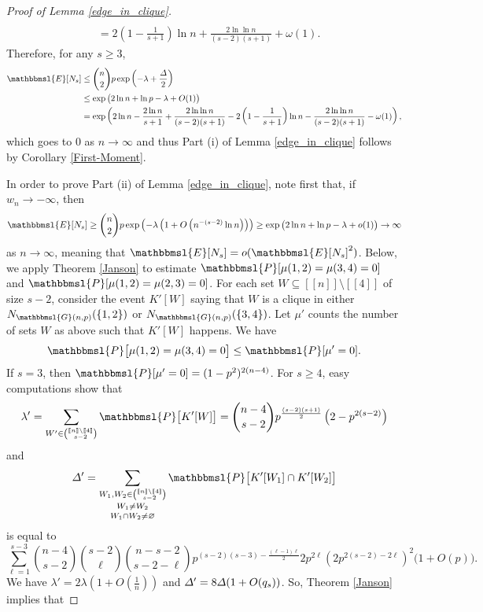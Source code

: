 \documentclass[hidelinks, 11pt]{article}
\theoremstyle{plain}
\theoremstyle{definition}
\begin{document}
\begin{proof}[Proof of Lemma \ref{edge_in_clique}]
\begin{align*}
\\&=2\left(1-\frac{1}{s+1}\right)\ln n+\frac{2\ln\ln n}{(s-2)(s+1)}+\omega(1).
\end{align*}
Therefore, for any $s\geq3$, 
\begin{align*}
\mathbbmsl{E}[N_s]&\leq{n\choose 2}p\exp\left(-\lambda+\frac{\mathnormal{\Delta}}{2}\right)\\&\leq\exp\big(2\ln n+\ln p-\lambda+O(1)\big)\\
&=\exp\left(2\ln n-\frac{2\ln n}{s+1}+\frac{2\ln\ln n}{(s-2)(s+1)}-2\left(1-\frac{1}{s+1}\right)\ln n-\frac{2\ln\ln n}{(s-2)(s+1)}-\omega(1)\right),
\end{align*}
which goes to $0$ as $n\to\infty$ and thus  Part (i)  of Lemma \ref{edge_in_clique} follows by Corollary \ref{First-Moment}.


In order  to  prove  Part (ii)  of Lemma \ref{edge_in_clique}, note first that,  if $w_n\to-\infty$, then
$$\mathbbmsl{E}[N_s]\geq{n\choose 2}p\exp\left(-\lambda\left(1+O\left(n^{-(s-2)}\ln n\right)\right)\right)\geq\exp\big(2\ln n+\ln p-\lambda+o(1)\big)\to\infty$$ as $n\to\infty$, meaning that  $\mathbbmsl{E}[N_s]=o(\mathbbmsl{E}[N_s]^2)$.
Below, we   apply   Theorem \ref{Janson} to   estimate $\mathbbmsl{P}[\mu(1,2)=\mu(3,4)=0]$ and $\mathbbmsl{P}[\mu(1,2)=\mu(2,3)=0]$.
For each set $W\subseteq[\![n]\!]\setminus[\![4]\!]$ of size $s-2$, consider the  event $K'[W]$ saying that   $W$ is a clique in either $N_{\mathbbmsl{G}(n,p)}(\{1, 2\})$ or   $N_{\mathbbmsl{G}(n,p)}(\{3, 4\})$.   Let $\mu'$ counts the number of sets $W$ as above such that $K'[W]$ happens. We have
\begin{equation}
\mathbbmsl{P}\big[\mu(1,2)=\mu(3,4)=0\big]\leq\mathbbmsl{P}[\mu'=0].\label{mu-one}
\end{equation}
If $s=3$, then $\mathbbmsl{P}[\mu'=0]=(1-p^2)^{2(n-4)}$. For $s\geq 4$, easy  computations  show that
$$\lambda'=\sum_{W'\in{[\![n]\!]\setminus[\![4]\!]\choose s-2}}\mathbbmsl{P}\big[K'[W]\big]={n-4\choose s-2}p^{\frac{(s-2)(s+1)}{2}}\left(2-p^{2(s-2)}\right)$$   and
$$\mathnormal{\Delta}'=\mathop{\mathop{\sum_{W_1,W_2\in{[\![n]\!]\setminus[\![4]\!]\choose s-2}}}_{W_1\neq W_2}}_{W_1\cap W_2\neq\varnothing}\mathbbmsl{P}\big[K'[W_1]\cap K'[W_2]\big]$$ is equal to $$\sum_{\ell=1}^{s-3}{n-4\choose s-2}{s-2\choose\ell}{n-s-2\choose s-2-\ell}
p^{(s-2)(s-3)-\frac{(\ell-1)\ell}{2}}2p^{2\ell}\left(2p^{2(s-2)-2\ell}\right)^2\big(1+O(p)\big).$$
We have $\lambda'=2\lambda(1+O(\tfrac{1}{n}))$ and $\mathnormal{\Delta}'=8\mathnormal{\Delta}(1+O(q_s))$.
So, Theorem \ref{Janson} implies that

\end{proof}
\end{document}
